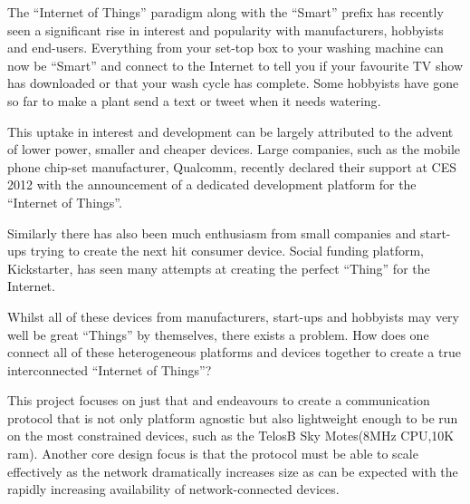 The ``Internet of Things'' paradigm along with the ``Smart'' prefix has recently seen a significant rise in interest and popularity with manufacturers, hobbyists and end-users. Everything from your set-top box to your washing machine can now be ``Smart'' and connect to the Internet to tell you if your favourite TV show has downloaded or that your wash cycle has complete\cite{LG, SmartCraze}. Some hobbyists have gone so far to make a plant send a text or tweet when it needs watering\cite{Botanicalls, TweetPlant}.

This uptake in interest and development can be largely attributed to the advent of lower power, smaller and cheaper devices. Large companies, such as the mobile phone chip-set manufacturer, Qualcomm, recently declared their support at CES 2012 with the announcement of a dedicated development platform for the ``Internet of Things''\cite{Qualcomm}.

Similarly there has also been much enthusiasm from small companies and start-ups trying to create the next hit consumer device. Social funding platform, Kickstarter\cite{Kickstarter}, has seen many attempts at creating the perfect ``Thing'' for the Internet\cite{SmartThings, Twine}.

Whilst all of these devices from manufacturers, start-ups and hobbyists may very well be great ``Things'' by themselves, there exists a problem. How does one connect all of these heterogeneous platforms and devices together to create a true interconnected ``Internet of Things''?

This project focuses on just that and endeavours to create a communication protocol that is not only platform agnostic but also lightweight enough to be run on the most constrained devices, such as the TelosB Sky Motes(8MHz CPU,10K ram)\cite{TelosB}. Another core design focus is that the protocol must be able to scale effectively as the network dramatically increases size as can be expected with the rapidly increasing availability of network-connected devices.
